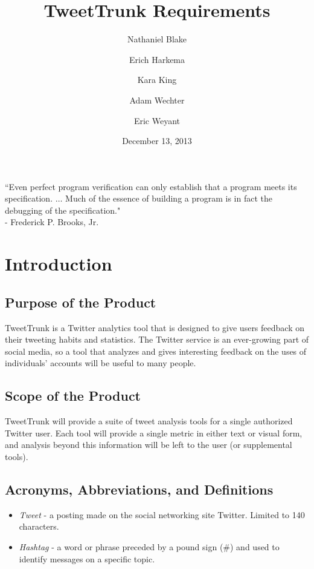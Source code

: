 \documentclass[a4paper, 12pt]{article}
\title{TweetTrunk Requirements}
\author{Nathaniel Blake \and Erich Harkema \and Kara King \and Adam Wechter \and Eric Weyant}
\date{December 13, 2013}
\begin{document}
\maketitle

\begin{center}
``Even perfect program verification can only establish that a program meets its specification. $\dots$ Much of the essence of building a program is in fact the debugging of the specification." \\
- Frederick P. Brooks, Jr.
\end{center}

\tableofcontents

\section{Introduction}

\subsection{Purpose of the Product}
TweetTrunk is a Twitter analytics tool that is designed to give users feedback on their tweeting habits and statistics.  The Twitter service is an ever-growing part of social media, so a tool that analyzes and gives interesting feedback on the uses of individuals’ accounts will be useful to many people.

\subsection{Scope of the Product}
TweetTrunk will provide a suite of tweet analysis tools for a single authorized Twitter user. Each tool will provide a single metric in either text or visual form, and analysis beyond this information will be left to the user (or supplemental tools).

\subsection{Acronyms, Abbreviations, and Definitions}
\begin{itemize}
\item \textit{Tweet} - a posting made on the social networking site Twitter.  Limited to 140 characters.
\item \textit{Hashtag} - a word or phrase preceded by a pound sign (\#) and used to identify messages on a specific topic.
\end{itemize}
\end{document}
